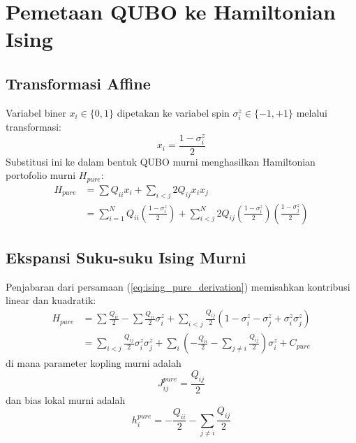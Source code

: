 \section{Pemetaan QUBO ke Hamiltonian Ising}

\subsection{Transformasi Affine}
Variabel biner $x_i \in \{0, 1\}$ dipetakan ke variabel spin $\sigma_i^z \in \{-1, +1\}$ melalui transformasi:
\begin{equation}
x_i = \frac{1 - \sigma_i^z}{2}
\label{eq:affine_transform_appendix}
\end{equation}
Substitusi ini ke dalam bentuk QUBO murni menghasilkan Hamiltonian portofolio murni $H_{pure}$:
\begin{equation}
\begin{aligned}
H_{pure} &= \sum Q_{ii} x_i + \sum_{i<j} 2Q_{ij} x_i x_j \\
&= \sum_{i=1}^N Q_{ii} \left(\frac{1 - \sigma_i^z}{2}\right) + \sum_{i<j}^N 2Q_{ij} \left(\frac{1 - \sigma_i^z}{2}\right)\left(\frac{1 - \sigma_j^z}{2}\right)
\end{aligned}
\label{eq:ising_pure_derivation}
\end{equation}

\subsection{Ekspansi Suku-suku Ising Murni}
Penjabaran dari persamaan (\ref{eq:ising_pure_derivation}) memisahkan kontribusi linear dan kuadratik:
\begin{equation}
\begin{aligned}
H_{pure} &= \sum \frac{Q_{ii}}{2} - \sum \frac{Q_{ii}}{2} \sigma_i^z + \sum_{i<j} \frac{Q_{ij}}{2} (1 - \sigma_i^z - \sigma_j^z + \sigma_i^z \sigma_j^z) \\
&= \sum_{i<j} \frac{Q_{ij}}{2} \sigma_i^z \sigma_j^z + \sum_i \left( -\frac{Q_{ii}}{2} - \sum_{j \neq i} \frac{Q_{ij}}{2} \right) \sigma_i^z + C_{pure}
\end{aligned}
\end{equation}
di mana parameter kopling murni adalah 
\begin{equation}
J_{ij}^{pure} = \frac{Q_{ij}}{2}
\end{equation}
dan bias lokal murni adalah
\begin{equation}
h_i^{pure} = -\frac{Q_{ii}}{2} - \sum_{j \neq i} \frac{Q_{ij}}{2}
\end{equation}

